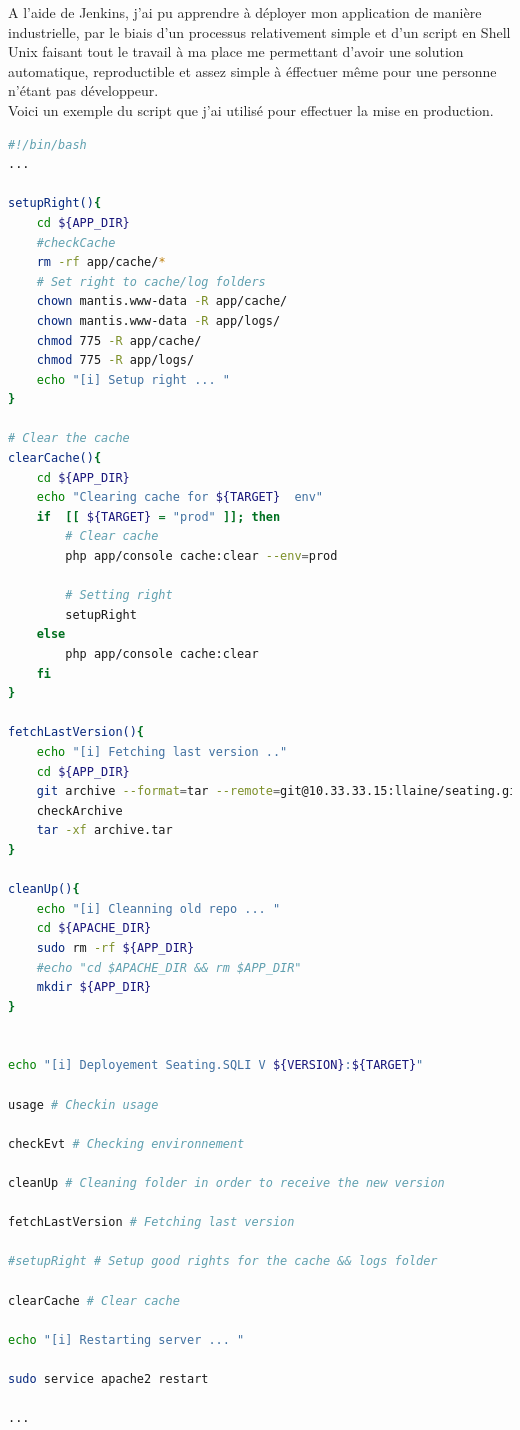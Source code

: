\documentclass{report}
\newcommand{\jumpOne}{\\[1\baselineskip]}
\begin{document}
A l'aide de \gls{Jenkins}, j'ai pu apprendre à déployer mon application de manière industrielle, par le biais d'un processus relativement simple et d'un script en Shell Unix faisant tout le travail à ma place me permettant d'avoir une solution automatique, reproductible et assez simple à éffectuer même pour une personne n'étant pas développeur. 
\jumpOne
Voici un exemple du script que j'ai utilisé pour effectuer la mise en production. 
\begin{lstlisting}[language=bash, caption=deploy.sh]
#!/bin/bash
...

setupRight(){
	cd ${APP_DIR}
   	#checkCache	
	rm -rf app/cache/*
	# Set right to cache/log folders
	chown mantis.www-data -R app/cache/
	chown mantis.www-data -R app/logs/
	chmod 775 -R app/cache/
	chmod 775 -R app/logs/
	echo "[i] Setup right ... "
}

# Clear the cache
clearCache(){
    cd ${APP_DIR}
    echo "Clearing cache for ${TARGET}  env"
    if  [[ ${TARGET} = "prod" ]]; then
        # Clear cache
        php app/console cache:clear --env=prod

        # Setting right
        setupRight
    else
        php app/console cache:clear
    fi
}

fetchLastVersion(){
    echo "[i] Fetching last version .."
    cd ${APP_DIR}
    git archive --format=tar --remote=git@10.33.33.15:llaine/seating.git ${VERSION} > archive.tar
    checkArchive
    tar -xf archive.tar
}

cleanUp(){
    echo "[i] Cleanning old repo ... "
    cd ${APACHE_DIR}
    sudo rm -rf ${APP_DIR}
    #echo "cd $APACHE_DIR && rm $APP_DIR"
    mkdir ${APP_DIR}
}


echo "[i] Deployement Seating.SQLI V ${VERSION}:${TARGET}"

usage # Checkin usage

checkEvt # Checking environnement

cleanUp # Cleaning folder in order to receive the new version

fetchLastVersion # Fetching last version

#setupRight # Setup good rights for the cache && logs folder

clearCache # Clear cache

echo "[i] Restarting server ... "

sudo service apache2 restart

...

\end{lstlisting}
\end{document}
